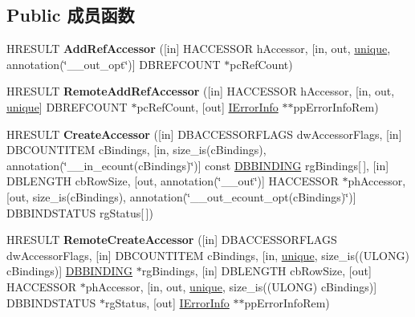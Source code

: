 \subsection*{Public 成员函数}
\begin{DoxyCompactItemize}
\item 
\mbox{\label{interface_i_accessor_a43de41dbe85d76526295e9febc0b3461}} 
H\+R\+E\+S\+U\+LT {\bfseries Add\+Ref\+Accessor} (\mbox{[}in\mbox{]} H\+A\+C\+C\+E\+S\+S\+OR h\+Accessor, \mbox{[}in, out, \hyperlink{interfaceunique}{unique}, annotation(\char`\"{}\+\_\+\+\_\+out\+\_\+opt\char`\"{})\mbox{]} D\+B\+R\+E\+F\+C\+O\+U\+NT $\ast$pc\+Ref\+Count)
\item 
\mbox{\label{interface_i_accessor_a19bb612b31650c17bac9f72550458bcb}} 
H\+R\+E\+S\+U\+LT {\bfseries Remote\+Add\+Ref\+Accessor} (\mbox{[}in\mbox{]} H\+A\+C\+C\+E\+S\+S\+OR h\+Accessor, \mbox{[}in, out, \hyperlink{interfaceunique}{unique}\mbox{]} D\+B\+R\+E\+F\+C\+O\+U\+NT $\ast$pc\+Ref\+Count, \mbox{[}out\mbox{]} \hyperlink{interface_i_error_info}{I\+Error\+Info} $\ast$$\ast$pp\+Error\+Info\+Rem)
\item 
\mbox{\label{interface_i_accessor_a48d958d1119cabbf3e8c2132806efd2c}} 
H\+R\+E\+S\+U\+LT {\bfseries Create\+Accessor} (\mbox{[}in\mbox{]} D\+B\+A\+C\+C\+E\+S\+S\+O\+R\+F\+L\+A\+GS dw\+Accessor\+Flags, \mbox{[}in\mbox{]} D\+B\+C\+O\+U\+N\+T\+I\+T\+EM c\+Bindings, \mbox{[}in, size\+\_\+is(c\+Bindings), annotation(\char`\"{}\+\_\+\+\_\+in\+\_\+ecount(c\+Bindings)\char`\"{})\mbox{]} const \hyperlink{structtag_d_b_b_i_n_d_i_n_g}{D\+B\+B\+I\+N\+D\+I\+NG} rg\+Bindings\mbox{[}$\,$\mbox{]}, \mbox{[}in\mbox{]} D\+B\+L\+E\+N\+G\+TH cb\+Row\+Size, \mbox{[}out, annotation(\char`\"{}\+\_\+\+\_\+out\char`\"{})\mbox{]} H\+A\+C\+C\+E\+S\+S\+OR $\ast$ph\+Accessor, \mbox{[}out, size\+\_\+is(c\+Bindings), annotation(\char`\"{}\+\_\+\+\_\+out\+\_\+ecount\+\_\+opt(c\+Bindings)\char`\"{})\mbox{]} D\+B\+B\+I\+N\+D\+S\+T\+A\+T\+US rg\+Status\mbox{[}$\,$\mbox{]})
\item 
\mbox{\label{interface_i_accessor_a21dda9587d743a63f0e242cf928cc0dc}} 
H\+R\+E\+S\+U\+LT {\bfseries Remote\+Create\+Accessor} (\mbox{[}in\mbox{]} D\+B\+A\+C\+C\+E\+S\+S\+O\+R\+F\+L\+A\+GS dw\+Accessor\+Flags, \mbox{[}in\mbox{]} D\+B\+C\+O\+U\+N\+T\+I\+T\+EM c\+Bindings, \mbox{[}in, \hyperlink{interfaceunique}{unique}, size\+\_\+is((U\+L\+O\+NG) c\+Bindings)\mbox{]} \hyperlink{structtag_d_b_b_i_n_d_i_n_g}{D\+B\+B\+I\+N\+D\+I\+NG} $\ast$rg\+Bindings, \mbox{[}in\mbox{]} D\+B\+L\+E\+N\+G\+TH cb\+Row\+Size, \mbox{[}out\mbox{]} H\+A\+C\+C\+E\+S\+S\+OR $\ast$ph\+Accessor, \mbox{[}in, out, \hyperlink{interfaceunique}{unique}, size\+\_\+is((U\+L\+O\+NG) c\+Bindings)\mbox{]} D\+B\+B\+I\+N\+D\+S\+T\+A\+T\+US $\ast$rg\+Status, \mbox{[}out\mbox{]} \hyperlink{interface_i_error_info}{I\+Error\+Info} $\ast$$\ast$pp\+Error\+Info\+Rem)

\end{DoxyCompactItemize}

